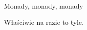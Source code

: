 \documentclass{beamer}
\begin{document}
\begin{frame}{Monady, monady, monady}

Właściwie na razie to tyle.

\end{frame}
\end{document}
